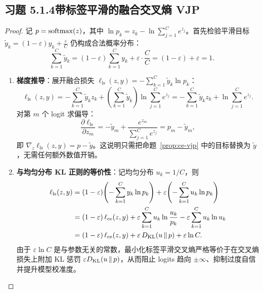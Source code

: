\subsection*{习题 5.1.4\quad 带标签平滑的融合交叉熵 VJP}
\begin{proof}
记 $p = \operatorname{softmax}(z)$，其中 $\ln p_k = z_k - \ln \sum_{j=1}^C e^{z_j}$。首先检验平滑目标 $\tilde{y}_k = (1-\varepsilon)y_k + \frac{\varepsilon}{C}$ 仍构成合法概率分布：
\[
  \sum_{k=1}^C \tilde{y}_k = (1-\varepsilon)\sum_{k=1}^C y_k + \varepsilon \cdot \frac{C}{C} = (1-\varepsilon) + \varepsilon = 1.
\]
\begin{enumerate}[label=(\arabic*), leftmargin=1.8em]
  \item \textbf{梯度推导}：展开融合损失 $\ell_{\text{ls}}(z, y) = -\sum_{k=1}^C \tilde{y}_k \ln p_k$：
  \[
    \ell_{\text{ls}}(z, y)
    = -\sum_{k=1}^C \tilde{y}_k z_k + \left(\sum_{k=1}^C \tilde{y}_k\right) \ln \sum_{j=1}^C e^{z_j}
    = -\sum_{k=1}^C \tilde{y}_k z_k + \ln \sum_{j=1}^C e^{z_j}.
  \]
  对第 $m$ 个 logit 求偏导：
  \[
    \frac{\partial \ell_{\text{ls}}}{\partial z_m}
    = -\tilde{y}_m + \frac{e^{z_m}}{\sum_{j=1}^C e^{z_j}}
    = p_m - \tilde{y}_m,
  \]
  即 $\nabla_z \ell_{\text{ls}}(z, y) = p - \tilde{y}$。这说明只需把命题~\ref{prop:ce-vjp} 中的目标替换为 $\tilde{y}$，无需任何额外数值开销。

  \item \textbf{与均匀分布 KL 正则的等价性}：记均匀分布 $u_k = 1/C$，则
  \begin{align*}
    \ell_{\text{ls}}(z, y)
    &= (1-\varepsilon)\!\left(-\sum_{k=1}^C y_k \ln p_k\right)
       + \varepsilon\!\left(-\sum_{k=1}^C u_k \ln p_k\right) \\
    &= (1-\varepsilon)\,\ell_{\text{ce}}(z, y)
       + \varepsilon \sum_{k=1}^C u_k \ln \frac{u_k}{p_k}
       - \varepsilon \sum_{k=1}^C u_k \ln u_k \\
    &= (1-\varepsilon)\,\ell_{\text{ce}}(z, y) + \varepsilon\,D_{\mathrm{KL}}(u \,\|\, p) + \varepsilon \ln C.
  \end{align*}
  由于 $\varepsilon \ln C$ 是与参数无关的常数，最小化标签平滑交叉熵严格等价于在交叉熵损失上附加 KL 惩罚 $\varepsilon D_{\mathrm{KL}}(u \,\|\, p)$，从而阻止 logits 趋向 $\pm\infty$、抑制过度自信并提升模型校准度。
\end{enumerate}
\end{proof}

